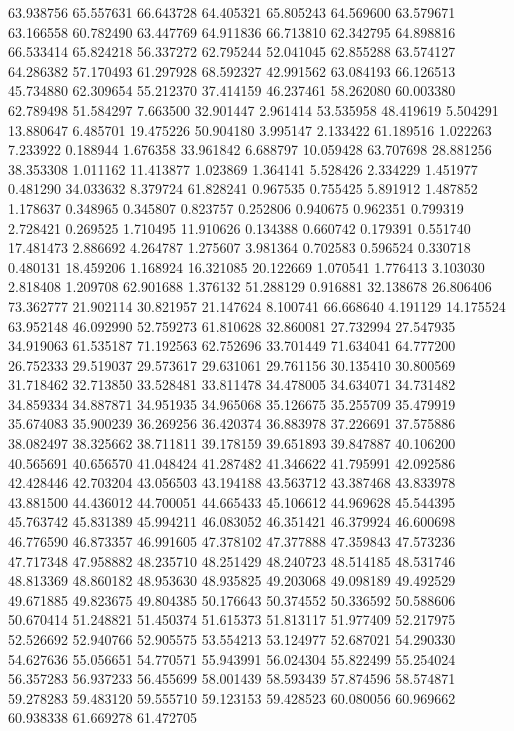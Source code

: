 63.938756
65.557631
66.643728
64.405321
65.805243
64.569600
63.579671
63.166558
60.782490
63.447769
64.911836
66.713810
62.342795
64.898816
66.533414
65.824218
56.337272
62.795244
52.041045
62.855288
63.574127
64.286382
57.170493
61.297928
68.592327
42.991562
63.084193
66.126513
45.734880
62.309654
55.212370
37.414159
46.237461
58.262080
60.003380
62.789498
51.584297
7.663500
32.901447
2.961414
53.535958
48.419619
5.504291
13.880647
6.485701
19.475226
50.904180
3.995147
2.133422
61.189516
1.022263
7.233922
0.188944
1.676358
33.961842
6.688797
10.059428
63.707698
28.881256
38.353308
1.011162
11.413877
1.023869
1.364141
5.528426
2.334229
1.451977
0.481290
34.033632
8.379724
61.828241
0.967535
0.755425
5.891912
1.487852
1.178637
0.348965
0.345807
0.823757
0.252806
0.940675
0.962351
0.799319
2.728421
0.269525
1.710495
11.910626
0.134388
0.660742
0.179391
0.551740
17.481473
2.886692
4.264787
1.275607
3.981364
0.702583
0.596524
0.330718
0.480131
18.459206
1.168924
16.321085
20.122669
1.070541
1.776413
3.103030
2.818408
1.209708
62.901688
1.376132
51.288129
0.916881
32.138678
26.806406
73.362777
21.902114
30.821957
21.147624
8.100741
66.668640
4.191129
14.175524
63.952148
46.092990
52.759273
61.810628
32.860081
27.732994
27.547935
34.919063
61.535187
71.192563
62.752696
33.701449
71.634041
64.777200
26.752333
29.519037
29.573617
29.631061
29.761156
30.135410
30.800569
31.718462
32.713850
33.528481
33.811478
34.478005
34.634071
34.731482
34.859334
34.887871
34.951935
34.965068
35.126675
35.255709
35.479919
35.674083
35.900239
36.269256
36.420374
36.883978
37.226691
37.575886
38.082497
38.325662
38.711811
39.178159
39.651893
39.847887
40.106200
40.565691
40.656570
41.048424
41.287482
41.346622
41.795991
42.092586
42.428446
42.703204
43.056503
43.194188
43.563712
43.387468
43.833978
43.881500
44.436012
44.700051
44.665433
45.106612
44.969628
45.544395
45.763742
45.831389
45.994211
46.083052
46.351421
46.379924
46.600698
46.776590
46.873357
46.991605
47.378102
47.377888
47.359843
47.573236
47.717348
47.958882
48.235710
48.251429
48.240723
48.514185
48.531746
48.813369
48.860182
48.953630
48.935825
49.203068
49.098189
49.492529
49.671885
49.823675
49.804385
50.176643
50.374552
50.336592
50.588606
50.670414
51.248821
51.450374
51.615373
51.813117
51.977409
52.217975
52.526692
52.940766
52.905575
53.554213
53.124977
52.687021
54.290330
54.627636
55.056651
54.770571
55.943991
56.024304
55.822499
55.254024
56.357283
56.937233
56.455699
58.001439
58.593439
57.874596
58.574871
59.278283
59.483120
59.555710
59.123153
59.428523
60.080056
60.969662
60.938338
61.669278
61.472705
